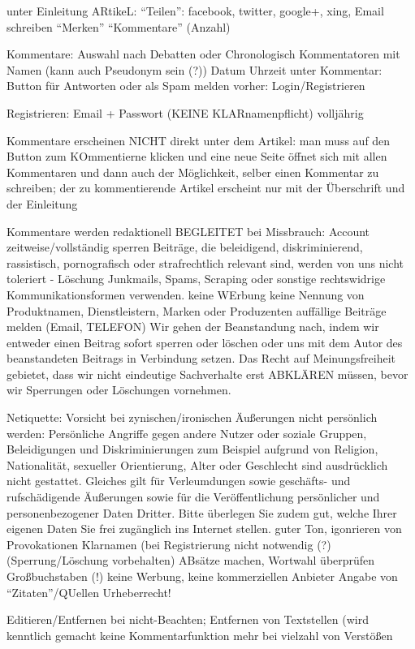 unter Einleitung ARtikeL: 
	``Teilen'': facebook, twitter, google+, xing, Email schreiben
	``Merken''
	``Kommentare'' (Anzahl)
	
Kommentare: Auswahl nach Debatten oder Chronologisch
	Kommentatoren mit Namen (kann auch Pseudonym sein (?)) Datum Uhrzeit
	unter Kommentar: Button für Antworten oder als Spam melden
	vorher: Login/Registrieren
	
Registrieren: Email + Passwort (KEINE KLARnamenpflicht)
	volljährig




Kommentare erscheinen NICHT direkt unter dem Artikel: man muss auf den Button zum KOmmentierne klicken und eine neue Seite öffnet sich mit allen Kommentaren und dann auch der Möglichkeit, selber einen Kommentar zu schreiben; der zu kommentierende Artikel erscheint nur mit der Überschrift und der Einleitung


Kommentare werden redaktionell BEGLEITET
bei Missbrauch: Account zeitweise/vollständig sperren
Beiträge, die beleidigend, diskriminierend, rassistisch, pornografisch oder strafrechtlich relevant sind, werden von uns nicht toleriert - Löschung
Junkmails, Spams, Scraping oder sonstige rechtswidrige Kommunikationsformen verwenden. 
keine WErbung
keine Nennung von Produktnamen, Dienstleistern, Marken oder Produzenten 
auffällige Beiträge melden (Email, TELEFON)
Wir gehen der Beanstandung nach, indem wir entweder einen Beitrag sofort sperren oder löschen oder uns mit dem Autor des beanstandeten Beitrags in Verbindung setzen. Das Recht auf Meinungsfreiheit gebietet, dass wir nicht eindeutige Sachverhalte erst ABKLÄREN müssen, bevor wir Sperrungen oder Löschungen vornehmen.

Netiquette:
	Vorsicht bei zynischen/ironischen Äußerungen
	nicht persönlich werden: Persönliche Angriffe gegen andere Nutzer oder soziale Gruppen, Beleidigungen und Diskriminierungen zum Beispiel aufgrund von Religion, Nationalität, sexueller Orientierung, Alter oder Geschlecht sind ausdrücklich nicht gestattet. Gleiches gilt für Verleumdungen sowie geschäfts- und rufschädigende Äußerungen sowie für die Veröffentlichung persönlicher und personenbezogener Daten Dritter. Bitte überlegen Sie zudem gut, welche Ihrer eigenen Daten Sie frei zugänglich ins Internet stellen.
	guter Ton, igonrieren von Provokationen
	Klarnamen (bei Registrierung nicht notwendig (?) (Sperrung/Löschung vorbehalten)
	ABsätze machen, Wortwahl überprüfen
	Großbuchstaben (!)
	keine Werbung, keine kommerziellen Anbieter
	Angabe von ``Zitaten''/QUellen
	Urheberrecht!
	
Editieren/Entfernen bei nicht-Beachten; Entfernen von Textstellen (wird kenntlich gemacht
keine Kommentarfunktion mehr bei vielzahl von Verstößen